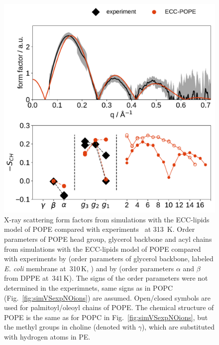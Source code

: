 \begin{figure}[tb!] 
  \centering 
  \includegraphics[width=\figwidth]{../img/ecc_pope/Order-parameters_form-factors_exp-ECC-POPE.pdf}
  \caption{\label{simVSexpNOions_POPE} 
    X-ray scattering form factors from simulations with 
    the ECC-lipids model of POPE compared with experiments~\cite{kucerka11} at 313~K. 
    Order parameters of POPE head group, glycerol backbone and acyl chains  
    from simulations with the ECC-lipids model of POPE
    compared with experiments by \citet{gally81} (order parameters of glycerol backbone, labeled \emph{E. coli} membrane at~310\,K, ) 
    and by \citet{seelig76, seelig80} (order parameters $\alpha$ and $\beta$ from DPPE at~341\,K).
    The signs of the order parameters were not determined in the experimnets, same signs as in POPC (Fig.~\ref{fig:simVSexpNOions}) are assumed. 
    Open/closed symbols are used for palmitoyl/oleoyl chains of POPE. 
    The chemical structure of POPE is the same as for POPC in Fig.~\ref{fig:simVSexpNOions}, 
    but the methyl groups in choline (denoted with $\gamma$), which are substituted with hydrogen atoms in PE. 
  }  
\end{figure} 


